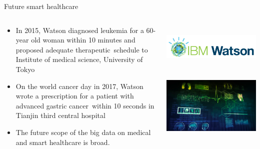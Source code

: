 \documentclass{beamer}
\begin{document}
\begin{CJK*}{UTF8}{gbsn}
\begin{frame}{Future smart healthcare}
\begin{columns}
\begin{column}{0.6\textwidth}
\begin{itemize}
\item In 2015, Watson diagnosed leukemia for a 60-year old woman within 10 minutes and proposed adequate therapeutic schedule to Institute of medical science, University of Tokyo

\item On the world cancer day in 2017, Watson wrote a prescription for a patient with advanced gastric cancer within 10 seconds in Tianjin third central hospital

\item The future scope of the big data on medical and smart healthcare is broad. 
\end{itemize}
\end{column}

\begin{column}{0.4\textwidth}
\centering  
\includegraphics[width=\textwidth]{figures/Watson1}  \\
\centering  
\includegraphics[width=\textwidth]{figures/Watson2}  
\end{column}
\end{columns}
\end{frame}



\end{CJK*}
\end{document}
